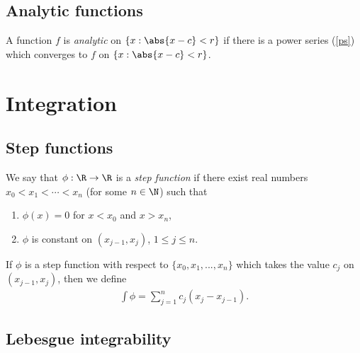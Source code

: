 \documentclass{article}
\begin{document}
\subsection{Analytic functions}

\begin{definition}
    A function $f$ is \emph{analytic} on $\{x: \abs{x-c}<r\}$ if there is a power
    series (\ref{ps}) which converges to $f$ on $\{x: \abs{x-c}<r\}$.
\end{definition}

\section{Integration}

\subsection{Step functions}

\begin{definition}[Notes 4.1]
    We say that $\phi:\R\to\R$ is a \emph{step function} if there exist real numbers
    $x_0<x_1<\cdots < x_n$ (for some $n\in\N$) such that
    \begin{enumerate}
        \item $\phi(x)=0$ for $x<x_0$ and $x>x_n$,
        \item $\phi$ is constant on $(x_{j-1}, x_j)$, $1\leq j\leq n$.
    \end{enumerate}
\end{definition}

\begin{definition}[Notes 4.2]
    If $\phi$ is a step function with respect to $\{x_0, x_1, ..., x_n\}$ which takes the
    value $c_j$ on $(x_{j-1}, x_j)$, then we define
    \begin{align*}
        \int \phi = \sum_{j=1}^n c_j(x_j-x_{j-1}).
    \end{align*}
\end{definition}

\subsection{Lebesgue integrability}
\end{document}
